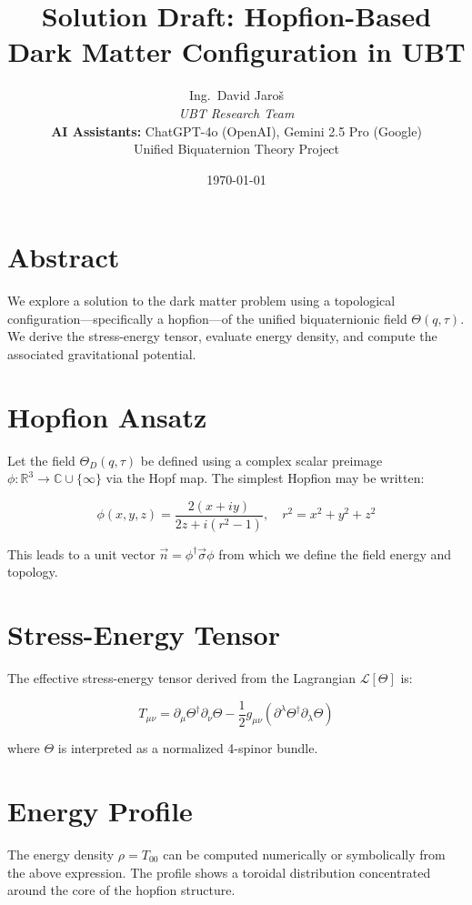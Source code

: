 \documentclass[12pt]{article}
\title{Solution Draft: Hopfion-Based Dark Matter Configuration in UBT}
\author{
Ing.~David Jaroš \\
\textit{UBT Research Team} \\
\textbf{AI Assistants:} ChatGPT-4o (OpenAI), Gemini 2.5 Pro (Google) \\
Unified Biquaternion Theory Project}
\date{\today}
\begin{document}
\maketitle

\section*{Abstract}
We explore a solution to the dark matter problem using a topological configuration—specifically a hopfion—of the unified biquaternionic field \( \Theta(q, \tau) \). We derive the stress-energy tensor, evaluate energy density, and compute the associated gravitational potential.

\section{Hopfion Ansatz}
Let the field \( \Theta_D(q, \tau) \) be defined using a complex scalar preimage \( \phi: \mathbb{R}^3 \to \mathbb{C} \cup \{\infty\} \) via the Hopf map. The simplest Hopfion may be written:

\[
\phi(x,y,z) = \frac{2(x + i y)}{2z + i(r^2 - 1)}, \quad r^2 = x^2 + y^2 + z^2
\]

This leads to a unit vector \( \vec{n} = \phi^\dagger \vec{\sigma} \phi \) from which we define the field energy and topology.

\section{Stress-Energy Tensor}
The effective stress-energy tensor derived from the Lagrangian \( \mathcal{L}[\Theta] \) is:

\[
T_{\mu\nu} = \partial_\mu \Theta^\dagger \partial_\nu \Theta - \frac{1}{2} g_{\mu\nu} \left( \partial^\lambda \Theta^\dagger \partial_\lambda \Theta \right)
\]

where \( \Theta \) is interpreted as a normalized 4-spinor bundle.

\section{Energy Profile}
The energy density \( \rho = T_{00} \) can be computed numerically or symbolically from the above expression. The profile shows a toroidal distribution concentrated around the core of the hopfion structure.
\end{document}
